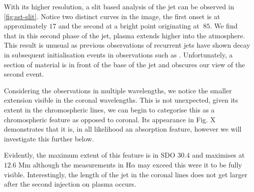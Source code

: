 \documentclass{emulateapj}
\begin{document}
With its higher resolution, a slit based analysis of the jet can be observed in \cref{fig:sst-slit}.
Notice two distinct curves in the image, the first onset is at approximately $17$ and the second at a bright point originating at $~85$.
We find that in this second phase of the jet, plasma extends higher into the atmosphere.
This result is unusual as previous observations of recurrent jets have shown decay in subsequent initialisation events in observations such as \cite{Jiang2007}.
Unfortunately, a section of material is in front of the base of the jet and obscures our view of the second event.

Considering the observations in multiple wavelengths, we notice the smaller extension visible in the coronal wavelengths.
This is not unexpected, given its extent in the chromospheric lines, we can begin to categorise this as a chromospheric feature as opposed to coronal.
Its appearance in Fig. X demonstrates that it is, in all likelihood an absorption feature, however we will investigate this further below.

Evidently, the maximum extent of this feature is in SDO $30.4$ and maximises at $12.6$ Mm although the measurements in H$\alpha$ may exceed this were it to be fully visible.
Interestingly, the length of the jet in the coronal lines does not get larger after the second injection on plasma occurs.
\end{document}
